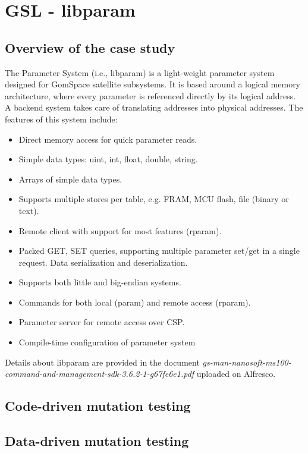 \section{GSL - libparam}
\label{sec:caseStudies:GSL:libparam}

\subsection{Overview of the case study}

The Parameter System (i.e., libparam) is a light-weight parameter system designed for GomSpace satellite subsystems. It is based around a logical memory architecture, where every parameter is referenced directly by its logical address. A backend system takes care of translating addresses into physical addresses.
The features of this system include:
\begin{itemize}
\item Direct memory access for quick parameter reads.
\item Simple data types: uint, int, float, double, string.
\item Arrays of simple data types.
\item Supports multiple stores per table, e.g. FRAM, MCU flash, file (binary or text).
\item Remote client with support for most features (rparam).
\item Packed GET, SET queries, supporting multiple parameter set/get in a single request. Data serialization and deserialization.
\item Supports both little and big-endian systems.
\item Commands for both local (param) and remote access (rparam).
\item Parameter server for remote access over CSP.
\item Compile-time configuration of parameter system
\end{itemize}

Details about libparam are provided in the document \emph{gs-man-nanosoft-ms100-command-and-management-sdk-3.6.2-1-g67fe6e1.pdf} uploaded on Alfresco.

\subsection{Code-driven mutation testing}


\subsection{Data-driven mutation testing}

